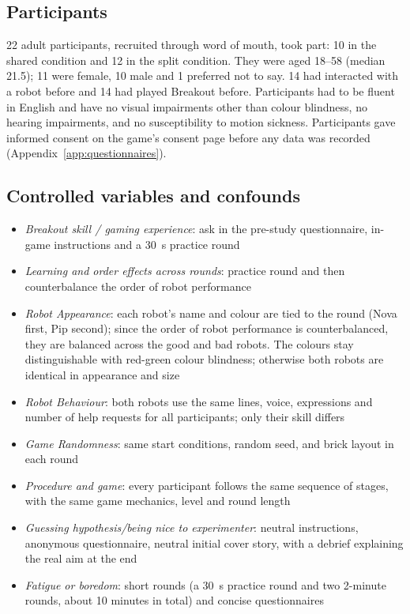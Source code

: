 \subsection{Participants}
22 adult participants, recruited through word of mouth, took part: 10 in the shared condition and 12 in the split condition. They were aged 18--58 (median 21.5); 11 were female, 10 male and 1 preferred not to say. 14 had interacted with a robot before and 14 had played Breakout before. Participants had to be fluent in English and have no visual impairments other than colour blindness, no hearing impairments, and no susceptibility to motion sickness. Participants gave informed consent on the game's consent page before any data was recorded (Appendix~\ref{app:questionnaires}).



\subsection{Controlled variables and confounds}
\begin{itemize}
    \item \textit{Breakout skill / gaming experience}: ask in the pre-study questionnaire, in-game instructions and a 30~s practice round
    \item \textit{Learning and order effects across rounds}: practice round and then counterbalance the order of robot performance
    \item \textit{Robot Appearance}: each robot's name and colour are tied to the round (Nova first, Pip second); since the order of robot performance is counterbalanced, they are balanced across the good and bad robots. The colours stay distinguishable with red-green colour blindness; otherwise both robots are identical in appearance and size
    \item \textit{Robot Behaviour}: both robots use the same lines, voice, expressions and number of help requests for all participants; only their skill differs
    \item \textit{Game Randomness}: same start conditions, random seed, and brick layout in each round
    \item \textit{Procedure and game}: every participant follows the same sequence of stages, with the same game mechanics, level and round length
    \item \textit{Guessing hypothesis/being nice to experimenter}: neutral instructions, anonymous questionnaire, neutral initial cover story, with a debrief explaining the real aim at the end
    \item \textit{Fatigue or boredom}: short rounds (a 30~s practice round and two 2-minute rounds, about 10 minutes in total) and concise questionnaires
\end{itemize}

